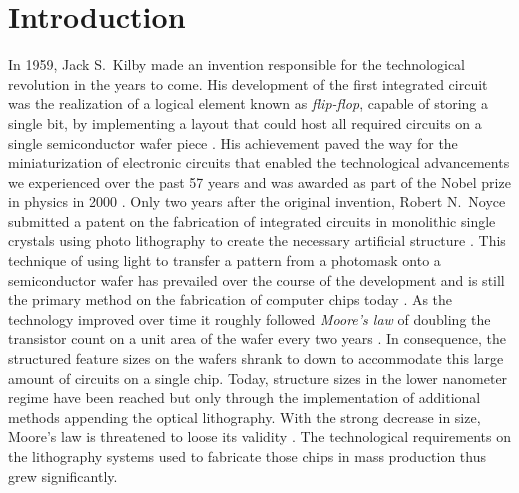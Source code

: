 \glsresetall
\chapter{Introduction} \label{ch:Intro}
In 1959, Jack S.~Kilby made an invention responsible for the technological revolution in the years to come. His development of the first integrated circuit was the realization of a logical element known as \emph{flip-flop}, capable of storing a single bit, by implementing a layout that could host all required circuits on a single semiconductor wafer piece  \cite{kilby_invention_1976}. His achievement paved the way for the miniaturization of electronic circuits that enabled the technological advancements we experienced over the past 57 years and was awarded as part of the Nobel prize in physics in 2000 \cite{noauthor_press_nodate}. Only two years after the original invention, Robert N.~Noyce submitted a patent on the fabrication of integrated circuits in monolithic single crystals using photo lithography to create the necessary artificial structure \cite{noyce_semiconductor_1961}. This technique of using light to transfer a pattern from a photomask onto a semiconductor wafer has prevailed over the course of the development and is still the primary method on the fabrication of computer chips today \cite{mack_fundamental_2008}. As the technology improved over time it roughly followed \emph{Moore's law} of doubling the transistor count on a unit area of the wafer every two years \cite{moore_cramming_1998}. In consequence, the structured feature sizes on the wafers shrank to down to accommodate this large amount of circuits on a single chip. Today, structure sizes in the lower nanometer regime have been reached \cite{international_roadmap_committee_international_2015} but only through the implementation of additional methods appending the optical lithography. With the strong decrease in size, Moore's law is threatened to loose its validity \cite{mack_fifty_2011, schaller_moores_1997}. The technological requirements on the lithography systems used to fabricate those chips in mass production thus grew significantly.

